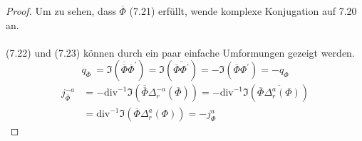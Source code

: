 \documentclass[11pt,a4paper,leqno]{report}
\numberwithin{equation}{chapter}
\begin{document}
\begin{proof}
	Um zu sehen, dass $\overline{\Phi}$ (7.21) erf\"ullt, wende komplexe Konjugation auf 7.20 an.\\
	\\
	(7.22) und (7.23) k\"onnen durch ein paar einfache Umformungen gezeigt werden.
	\begin{equation*}
		q_{\overline{\Phi}}\ = \Im(\overline{\overline{\Phi}}\overline{\Phi}^\prime)
		 = \Im(\overline{\overline{\Phi}\Phi^\prime}) = -\Im(\overline{\Phi}\Phi^\prime)
		 = -q_\Phi
	\end{equation*}
	\begin{align*}
j_{\overline{\Phi}}^{-a} &= -\text{div}^{-1}\Im(\overline{\overline{\Phi}}\Delta^{-a}_r(\overline{\Phi}))
= -\text{div}^{-1}\Im(\overline{\overline{\Phi}\Delta^a_r(\Phi)})\\
&= \text{div}^{-1}\Im(\overline{\Phi}\Delta^a_r(\Phi))= -j_{\Phi}^a
	\end{align*}
\end{proof}
\end{document}

